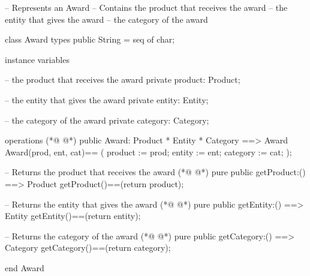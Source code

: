 \begin{vdmpp}[breaklines=true]
-- Represents an Award
-- Contains the product that receives the award
--      the entity that gives the award
--          the category of the award

class Award
 types
    public String = seq of char;

 instance variables
 
   -- the product that receives the award
  private product: Product;
  
   -- the entity that gives the award
  private entity: Entity;
  
   -- the category of the award
  private category: Category;

 operations
(*@
\label{Award:22}
@*)
  public Award: Product * Entity * Category ==> Award
  Award(prod, ent, cat)== 
  (
    product := prod;
    entity := ent;
    category := cat;
  );
  
  -- Returns the product that receives the award
(*@
\label{getProduct:31}
@*)
  pure public getProduct:() ==> Product
     getProduct()==(return product);
     
  -- Returns the entity that gives the award
(*@
\label{getEntity:35}
@*)
   pure public getEntity:() ==> Entity
    getEntity()==(return entity);
   
  -- Returns the category of the award
(*@
\label{getCategory:39}
@*)
   pure public getCategory:() ==> Category
    getCategory()==(return category); 
     

end Award
\end{vdmpp}
